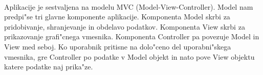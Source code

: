 \paragraph{}Aplikacije je sestvaljena na modelu MVC (Model-View-Controller). Model nam predpi"se tri glavne komponente aplikacije. Komponenta Model skrbi za pridobivanje, shranjevanje in obdelavo podatkov. Komponenta View skrbi za prikazovanje grafi"cnega vmesnika. Komponenta Controller pa povezuje Model in View med seboj. Ko uporabnik pritisne na dolo"ceno del uporabni"skega vmesnika, gre Controller po podatke v Model objekt in nato pove View objektu katere podatke naj prika"ze. 
